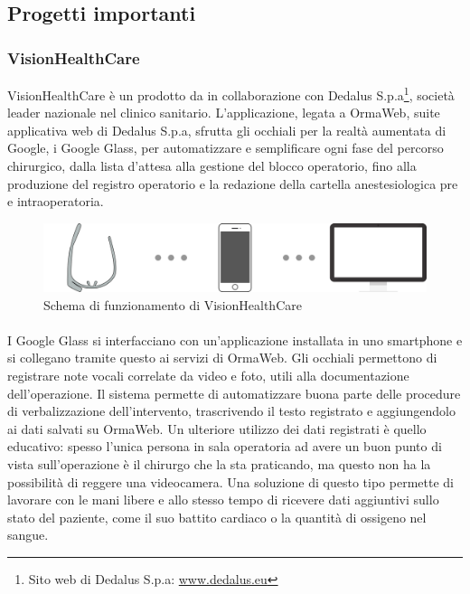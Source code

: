    \subsection{Progetti importanti}
   \subsubsection{VisionHealthCare}
   VisionHealthCare è un  prodotto da \nomeAzienda{} in collaborazione con Dedalus S.p.a\footnote{Sito web di Dedalus S.p.a: \href{http://www.dedalus.eu}{www.dedalus.eu}}, società leader nazionale nel  clinico sanitario. L'applicazione, legata a OrmaWeb, suite applicativa web di Dedalus S.p.a, sfrutta gli occhiali per la realtà aumentata di Google, i Google Glass, per automatizzare e semplificare ogni fase del percorso chirurgico, dalla lista d'attesa alla gestione del blocco operatorio, fino alla produzione del registro operatorio e la redazione della cartella anestesiologica pre e intraoperatoria.
   \begin{figure}[H]
      \begin{center}
         \includegraphics[width=15cm,keepaspectratio]{immagini/visionhealthcare-schema}
      \end{center}
      \caption{Schema di funzionamento di VisionHealthCare}\label{schemavisionhealthcare}
   \end{figure}
   \paragraph*{} I Google Glass si interfacciano con un'applicazione installata in uno smartphone e si collegano tramite questo ai servizi di OrmaWeb.
   Gli occhiali permettono di registrare note vocali correlate da video e foto, utili alla documentazione dell'operazione. Il sistema permette di automatizzare buona parte delle procedure di verbalizzazione dell'intervento, trascrivendo il testo registrato e aggiungendolo ai dati salvati su OrmaWeb. Un ulteriore utilizzo dei dati registrati è quello educativo: spesso l'unica persona in sala operatoria ad avere un buon punto di vista sull'operazione è il chirurgo che la sta praticando, ma questo non ha la possibilità di reggere una videocamera. Una soluzione di questo tipo permette di lavorare con le mani libere e allo stesso tempo di ricevere dati aggiuntivi sullo stato del paziente, come il suo battito cardiaco o la quantità di ossigeno nel sangue.

